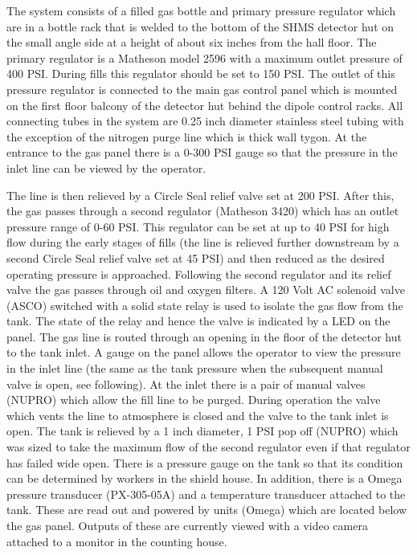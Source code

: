 \documentclass[12pt]{article}
\begin{document}
{ \color{red}  

The system consists of a filled gas bottle and primary pressure regulator which are in a bottle rack that is welded to
the bottom of the SHMS detector hut on the small angle side at a height of about six inches from the hall floor. The primary regulator is a Matheson model 2596 with a maximum outlet pressure of 400 PSI.
During fills this regulator should be set to 150 PSI. The outlet of this pressure regulator is connected to the
main gas control panel which is mounted on the first floor balcony of the detector hut behind the dipole control racks. All connecting tubes in the system are 0.25 inch diameter stainless steel tubing with the exception of the nitrogen purge line which is thick wall tygon. At the entrance to the gas panel there is a 0-300 PSI gauge so that the pressure in the inlet line can be viewed by the operator.


The line is then relieved by a Circle Seal relief valve set at 200 PSI.
After this, the gas passes through a second regulator (Matheson 3420)
which has an outlet pressure range of 0-60 PSI. This regulator can be set at
up to 40 PSI for high flow during the early stages of fills
(the line is relieved further downstream by a second
Circle Seal relief valve set at 45 PSI) and then reduced as
the desired operating pressure is approached. Following the second regulator
and its relief valve the gas passes through oil and oxygen filters.
A 120 Volt AC solenoid valve (ASCO) switched with a solid state
relay is used to isolate the gas flow from the tank. The state of
the relay and hence the valve is indicated by a LED on the panel.
The gas line is routed through an opening in the floor of the detector hut
to the tank inlet. A gauge on the panel allows the operator to view
the pressure in the inlet line (the same as the tank pressure
when the subsequent manual valve is open, see following).
At the inlet there is a pair of manual valves (NUPRO)
which allow the fill line to be purged.
During operation the valve which vents the
line to atmosphere is closed and the valve to the tank inlet is open.
The tank is relieved by a 1 inch diameter, 1 PSI pop off (NUPRO) which was
sized to take the
maximum flow of the second regulator even if that regulator has failed
wide open. There is a pressure gauge on the tank so that its condition
can be determined by workers in the shield house. In addition,
there is a Omega pressure transducer (PX-305-05A) and a temperature
transducer attached to the tank. These are read out and powered by
units (Omega) which are located below the gas panel.  Outputs of these
are currently viewed with a video camera attached
to a monitor in the counting house.

}
\end{document}
